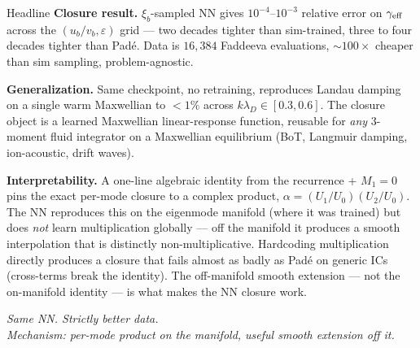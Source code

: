 \documentclass[10pt, aspectratio=169]{beamer}
\newcommand{\xib}{\xi_b}
\newcommand{\ub}{u_b}
\newcommand{\vb}{v_b}
\begin{document}
\begin{frame}{Headline}
  \footnotesize
  \textbf{Closure result.} $\xib$-sampled NN gives $10^{-4}$--$10^{-3}$
  relative error on $\gamma_{\rm eff}$ across the $(\ub/\vb, \varepsilon)$
  grid --- two decades tighter than sim-trained, three to four decades
  tighter than Pad\'e. Data is $16{,}384$ Faddeeva evaluations,
  $\sim\!100\times$ cheaper than sim sampling, problem-agnostic.

  \vspace{0.4em}
  \textbf{Generalization.} Same checkpoint, no retraining, reproduces
  Landau damping on a single warm Maxwellian to $<\!1\%$ across
  $k\lambda_D \in [0.3, 0.6]$. The closure object is a learned Maxwellian
  linear-response function, reusable for \emph{any} 3-moment fluid
  integrator on a Maxwellian equilibrium (BoT, Langmuir damping,
  ion-acoustic, drift waves).

  \vspace{0.5em}
  \textbf{Interpretability.} A one-line algebraic identity from the
  recurrence + $M_1\!=\!0$ pins the exact per-mode closure to a complex
  product, $\alpha = (U_1/U_0)(U_2/U_0)$. The NN reproduces this on the
  eigenmode manifold (where it was trained) but does \emph{not} learn
  multiplication globally --- off the manifold it produces a smooth
  interpolation that is distinctly non-multiplicative. Hardcoding
  multiplication directly produces a closure that fails almost as badly
  as Pad\'e on generic ICs (cross-terms break the identity). The
  off-manifold smooth extension --- not the on-manifold identity --- is
  what makes the NN closure work.

  \vspace{0.3em}
  \begin{center}
    \emph{Same NN. Strictly better data.\\
    Mechanism: per-mode product on the manifold, useful smooth
    extension off it.}
  \end{center}
\end{frame}
\end{document}
